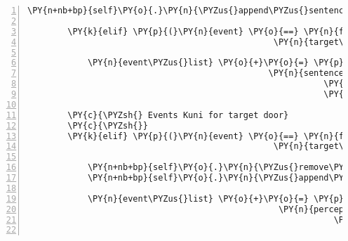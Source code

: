 \begin{Verbatim}[commandchars=\\\{\},numbers=left,firstnumber=1,stepnumber=1]
                \PY{n+nb+bp}{self}\PY{o}{.}\PY{n}{\PYZus{}append\PYZus{}sentence}\PY{p}{(}\PY{n}{ID\PYZus{}KUNI}\PY{p}{,} \PY{l+s}{\PYZsq{}}\PY{l+s}{Hinter der Spinne ist doch irgendwas!}\PY{l+s}{\PYZsq{}}\PY{p}{)}

        \PY{k}{elif} \PY{p}{(}\PY{n}{event} \PY{o}{==} \PY{n}{fabula}\PY{o}{.}\PY{n}{TriesToTalkToEvent}\PY{p}{(}\PY{n}{identifier}\PY{o}{=}\PY{n}{ID\PYZus{}KUNI}\PY{p}{,}
                                                 \PY{n}{target\PYZus{}identifier}\PY{o}{=}\PY{l+s}{\PYZsq{}}\PY{l+s}{spider}\PY{l+s}{\PYZsq{}}\PY{p}{)}\PY{p}{)}\PY{p}{:}

            \PY{n}{event\PYZus{}list} \PY{o}{+}\PY{o}{=} \PY{p}{[}\PY{n}{fabula}\PY{o}{.}\PY{n}{CanSpeakEvent}\PY{p}{(}\PY{n}{identifier}\PY{o}{=}\PY{n}{ID\PYZus{}KUNI}\PY{p}{,}
                                                \PY{n}{sentences}\PY{o}{=}\PY{p}{[}\PY{l+s}{\PYZsq{}}\PY{l+s}{Öhm, kannst du mal beiseite treten?}\PY{l+s}{\PYZsq{}}\PY{p}{,}
                                                           \PY{l+s}{\PYZsq{}}\PY{l+s}{Rück mal ein Stück!}\PY{l+s}{\PYZsq{}}\PY{p}{,}
                                                           \PY{l+s}{\PYZsq{}}\PY{l+s}{Geh mir aus dem Weg!}\PY{l+s}{\PYZsq{}}\PY{p}{]}\PY{p}{)}\PY{p}{]}

        \PY{c}{\PYZsh{} Events Kuni for target door}
        \PY{c}{\PYZsh{}}
        \PY{k}{elif} \PY{p}{(}\PY{n}{event} \PY{o}{==} \PY{n}{fabula}\PY{o}{.}\PY{n}{TriesToLookAtEvent}\PY{p}{(}\PY{n}{identifier}\PY{o}{=}\PY{n}{ID\PYZus{}KUNI}\PY{p}{,}
                                                 \PY{n}{target\PYZus{}identifier}\PY{o}{=}\PY{l+s}{\PYZsq{}}\PY{l+s}{door}\PY{l+s}{\PYZsq{}}\PY{p}{)}\PY{p}{)}\PY{p}{:}

            \PY{n+nb+bp}{self}\PY{o}{.}\PY{n}{\PYZus{}remove\PYZus{}sentence}\PY{p}{(}\PY{n}{ID\PYZus{}KUNI}\PY{p}{,} \PY{l+s}{\PYZsq{}}\PY{l+s}{Es muss irgendwo einen Eingang zum alten Gnomenweg geben.}\PY{l+s}{\PYZsq{}}\PY{p}{)}
            \PY{n+nb+bp}{self}\PY{o}{.}\PY{n}{\PYZus{}append\PYZus{}sentence}\PY{p}{(}\PY{n}{ID\PYZus{}KUNI}\PY{p}{,} \PY{l+s}{\PYZsq{}}\PY{l+s}{Ich hab den Eingang zum Gnomenweg gefunden! Aber er ist verschlossen.}\PY{l+s}{\PYZsq{}}\PY{p}{)}

            \PY{n}{event\PYZus{}list} \PY{o}{+}\PY{o}{=} \PY{p}{[}\PY{n}{fabula}\PY{o}{.}\PY{n}{PerceptionEvent}\PY{p}{(}\PY{n}{identifier}\PY{o}{=}\PY{n}{ID\PYZus{}KUNI}\PY{p}{,}
                                                  \PY{n}{perception}\PY{o}{=}\PY{l+s}{\PYZsq{}}\PY{l+s}{Das müsste die Tür zum Gnomenweg sein! }\PY{l+s}{\PYZsq{}}
                                                             \PY{l+s}{\PYZsq{}}\PY{l+s}{Mist, sie ist verschlossen.}\PY{l+s}{\PYZsq{}}\PY{p}{)}\PY{p}{]}


\end{Verbatim}
